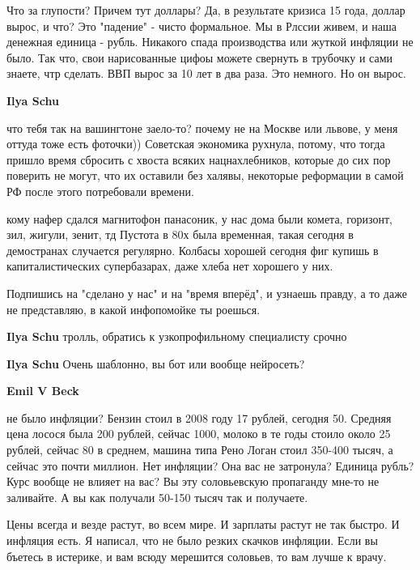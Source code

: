 \begin{itemize}
\begin{itemize}

Что за глупости? Причем тут доллары? Да, в результате кризиса 15 года, доллар
вырос, и что? Это "падение" - чисто формальное. Мы в Рлссии живем, и наша
денежная единица - рубль. Никакого спада производства или жуткой инфляции не
было. Так что, свои нарисованные цифоы можете свернуть в трубочку и сами
знаете, чтр сделать. ВВП вырос за 10 лет в два раза. Это немного. Но он вырос.

\textbf{Ilya Schu} 

что тебя так на вашингтоне заело-то? почему не на Москве или львове, у меня
оттуда тоже есть фоточки)) Советская экономика рухнула, потому, что тогда
пришло время сбросить с хвоста всяких нацнахлебников, которые до сих пор
поверить не могут, что их оставили без халявы, некоторые реформации в самой РФ
после этого потребовали времени.

кому нафер сдался магнитофон панасоник, у нас дома были комета, горизонт, зил,
жигули, зенит, тд Пустота в 80х была временная, такая сегодня в демостранах
случается регулярно. Колбасы хорошей сегодня фиг купишь в капиталистических
супербазарах, даже хлеба нет хорошего у них.

Подпишись на "сделано у нас" и на "время вперёд", и узнаешь правду, а то даже
не представляю, в какой инфопомойке ты роешься.

\textbf{Ilya Schu} тролль, обратись к узкопрофильному специалисту срочно

\textbf{Ilya Schu} Очень шаблонно, вы бот или вообще нейросеть?

\textbf{Emil V Beck} 

не было инфляции? Бензин стоил в 2008 году 17 рублей, сегодня 50. Средняя цена
лосося была 200 рублей, сейчас 1000, молоко в те годы стоило около 25 рублей,
сейчас 80 в среднем, машина типа Рено Логан стоил 350-400 тысяч, а сейчас это
почти миллион. Нет инфляции? Она вас не затронула? Единица рубль? Курс вообще
не влияет на вас? Вы эту соловьевскую пропаганду мне-то не заливайте. А вы как
получали 50-150 тысяч так и получаете.


Цены всегда и везде растут, во всем мире. И зарплаты растут не так быстро. И
инфляция есть. Я написал, что не было резких скачков инфляции. Если вы бъетесь
в истерике, и вам всюду мерешится соловьев, то вам лучше к врачу.


\end{itemize} %


\end{itemize}
